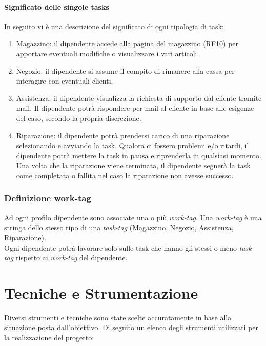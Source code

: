 \documentclass{report}
\begin{document}
\subsubsection*{Significato delle singole tasks}

In seguito vi è una descrizione del significato di ogni tipologia di task:

\begin{enumerate}
	\item Magazzino: il dipendente accede alla pagina del magazzino (RF10) per apportare eventuali modifiche o visualizzare i vari articoli.
	
	\item Negozio: il dipendente si assume il compito di rimanere alla cassa per interagire con eventuali clienti.
	
	\item Assistenza: il dipendente visualizza la richiesta di supporto dal cliente tramite mail. Il dipendente potrà rispondere per mail al cliente in base alle esigenze del caso, secondo la propria discrezione.
	
	\item Riparazione: il dipendente potrà prendersi carico di una riparazione selezionando e avviando la task. Qualora ci fossero problemi e/o ritardi, il dipendente potrà mettere la task in pausa e riprenderla in qualsiasi momento. Una volta che la riparazione viene terminata, il dipendente segnerà la task come completata o fallita nel caso la riparazione non avesse successo.
	
\end{enumerate}

\subsection*{Definizione work-tag}
Ad ogni profilo dipendente sono associate una o più \textit{work-tag}. Una \textit{work-tag} è una stringa dello stesso tipo di una \textit{task-tag} (Magazzino, Negozio, Assistenza, Riparazione).\\
Ogni dipendente potrà lavorare solo sulle task che hanno gli stessi o meno \textit{task-tag} rispetto ai \textit{work-tag} del dipendente.


\chapter{Tecniche e Strumentazione}
Diversi strumenti e tecniche sono state scelte accuratamente in base alla situazione posta dall’obiettivo. Di seguito un elenco degli strumenti utilizzati per la realizzazione del progetto:
\end{document}
